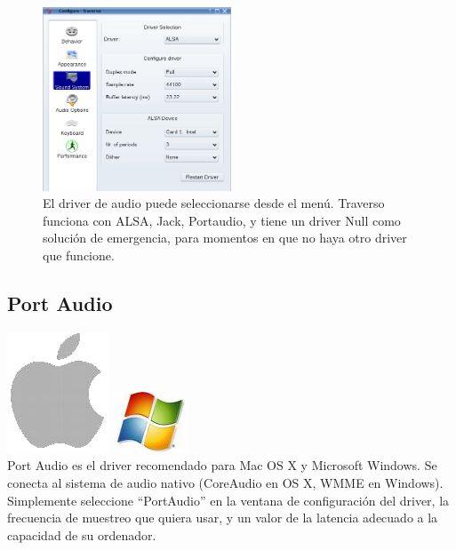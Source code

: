 \begin{figure}
 \centering\includegraphics[width=0.5\textwidth]{../images/sshot02.png}
 \caption{El driver de audio puede seleccionarse desde el menú. Traverso funciona con ALSA, Jack, Portaudio, y tiene un driver {Null} como solución de emergencia, para momentos en que no haya otro driver que funcione.}
 \label{fig_driverconf}
\end{figure}

\subsection{Port Audio}
\includegraphics[height=\baselineskip]{../images/mac.png}
\includegraphics[height=\baselineskip]{../images/win.png}
\\

Port Audio es el driver recomendado para Mac OS X y Microsoft Windows. Se conecta al sistema de audio nativo (CoreAudio en OS X, WMME en Windows). Simplemente seleccione ``PortAudio'' en la ventana de configuración del driver, la frecuencia de muestreo que quiera usar, y un valor de la latencia adecuado a la capacidad de su ordenador.

